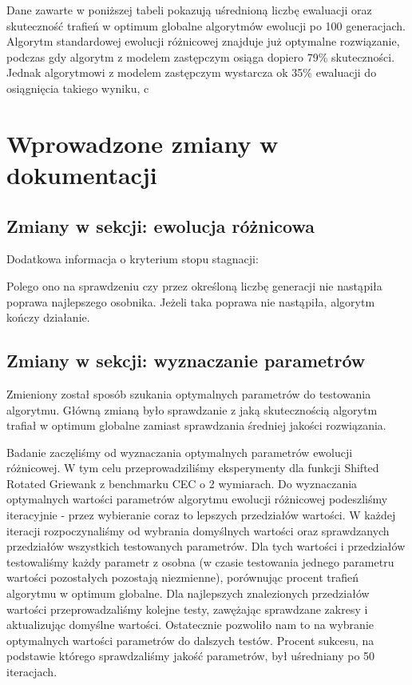 \documentclass{article}
\begin{document}
Dane zawarte w poniższej tabeli pokazują uśrednioną liczbę ewaluacji oraz skuteczność trafień w optimum globalne algorytmów ewolucji po 100 generacjach. Algorytm standardowej ewolucji różnicowej znajduje już optymalne rozwiązanie, podczas gdy algorytm z modelem zastępczym osiąga dopiero 79\% skuteczności. Jednak algorytmowi z modelem zastępczym wystarcza ok 35\% ewaluacji do osiągnięcia takiego wyniku, c

\section{Wprowadzone zmiany w dokumentacji}

\subsection{Zmiany w sekcji: ewolucja różnicowa}

Dodatkowa informacja o kryterium stopu stagnacji:

Polego ono na sprawdzeniu czy przez określoną liczbę generacji nie nastąpiła poprawa najlepszego osobnika. Jeżeli taka poprawa nie nastąpiła, algorytm kończy działanie.

\subsection{Zmiany w sekcji: wyznaczanie parametrów}

Zmieniony został sposób szukania optymalnych parametrów do testowania algorytmu. Główną zmianą było sprawdzanie z jaką skutecznością algorytm trafiał w optimum globalne zamiast sprawdzania średniej jakości rozwiązania.

Badanie zaczęliśmy od wyznaczania optymalnych parametrów ewolucji różnicowej. W tym celu przeprowadziliśmy eksperymenty dla funkcji Shifted Rotated Griewank z benchmarku CEC o 2 wymiarach. Do wyznaczania optymalnych wartości parametrów algorytmu ewolucji różnicowej podeszliśmy iteracyjnie - przez wybieranie coraz to lepszych przedziałów wartości. W każdej iteracji rozpoczynaliśmy od wybrania domyślnych wartości oraz sprawdzanych przedziałów wszystkich testowanych parametrów. Dla tych wartości i przedziałów testowaliśmy każdy parametr z osobna (w czasie testowania jednego parametru wartości pozostałych pozostają niezmienne), porównując procent trafień algorytmu w optimum globalne. Dla najlepszych znalezionych przedziałów wartości przeprowadzaliśmy kolejne testy, zawężając sprawdzane zakresy i aktualizując domyślne wartości. Ostatecznie pozwoliło nam to na wybranie optymalnych wartości parametrów do dalszych testów. Procent sukcesu, na podstawie którego sprawdzaliśmy jakość parametrów, był uśredniany po 50 iteracjach. 
\end{document}
